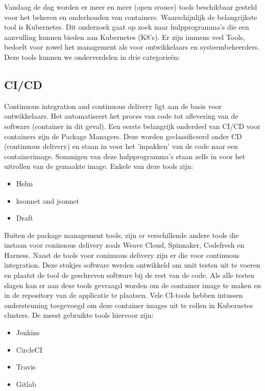 Vandaag de dag worden er meer en meer (open srouce) tools beschikbaar gesteld voor het beheren en onderhouden van containers. Waarschijnlijk de belangrijkste tool is Kubernetes. Dit onderzoek gaat op zoek naar hulpprogramma's die een aanvulling kunnen bieden aan Kubernetes (K8's). Er zijn immens veel Tools, bedoelt voor zowel het management als voor ontwikkelaars en systeembeheerders. Deze tools kunnen we onderverdelen in drie categorieën:

\subsection{CI/CD}
Continuous integration and continuous delivery ligt aan de basis voor ontwikkelaars. Het automatiseert het proces van code tot aflevering van de software (container in dit geval). Een eerste belangrijk onderdeel van CI/CD voor containers zijn de Package Managers. Deze worden geclassificeerd onder CD (continuous delivery) en staan in voor het 'inpakken' van de code naar een containerimage. Sommigen van deze hulpprogramma's staan zelfs in voor het uitrollen van de gemaakte image. Enkele van deze tools zijn: \autocite{Buehrle2018pt1}
\begin{itemize}
    \item Helm
    \item ksonnet and jsonnet
    \item Draft
\end{itemize}
Buiten de package management tools, zijn er verschillende andere tools die instaan voor coninuous delivery zoals Weave Cloud, Spinnaker, Codefresh en Harness. Naast de tools voor coninuous delivery zijn er die voor continuous integration. Deze stukjes software werden ontwikkeld om unit testen uit te voeren en plaatst de tool de geschreven software bij de rest van de code. Als alle testen slagen kan er aan deze tools gevraagd worden om de container image te maken en in de repository van de applicatie te plaatsen. Vele CI-tools hebben intussen ondersteuning toegevoegd om deze container images uit te rollen in Kubernetes clusters. De meest gebruikte tools hiervoor zijn:
\begin{itemize}
    \item Jenkins
    \item CircleCI
    \item Travis
    \item Gitlab
\end{itemize}
